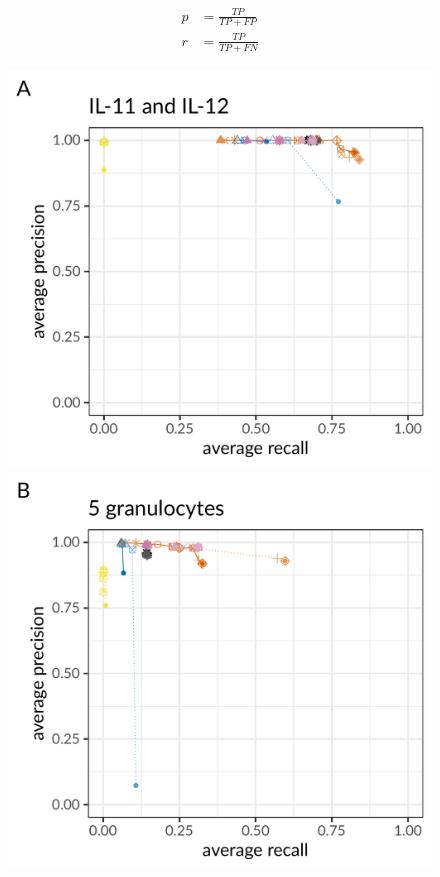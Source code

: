 \documentclass[authoryear,preprint,11pt]{scrartcl}
\begin{document}
\begin{equation}
  \label{eq:precp-rec}
  \begin{split}
    p &= \frac{TP}{TP + FP} \\
    r &= \frac{TP}{TP + FN}
  \end{split}
\end{equation}

\begin{figure}[!tpb]
 \begin{minipage}{.48\linewidth}
  \includegraphics[height=42ex]{figs/Dong2017/Dong2017_prosolo-monovar-scansnv-sccaller_precision-recall-plot.pdf} \newline
 \end{minipage}
 \begin{minipage}{.48\linewidth}
  \includegraphics[height=42ex]{figs/Laehnemann2017/Laehnemann2017_prosolo-monovar-scansnv-sccaller-sciphi_precision-recall-plot.pdf} \newline
 \end{minipage}
 \begin{minipage}{.9\linewidth}

\end{minipage}
\end{figure}
\end{document}
